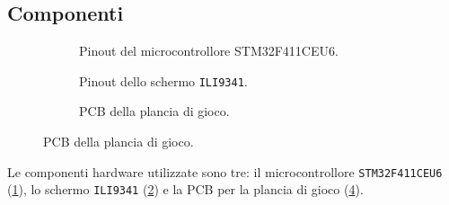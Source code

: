 \documentclass[12pt]{article}
\begin{document}
\subsection{Componenti}
\begin{figure}[h]
	\begin{subfigure}[t]{0.32\textwidth}
		\begin{center}
			\begin{tikzpicture}[x=0.015cm, y=0.015cm, scale=0.5, transform shape]
				
			\end{tikzpicture}
		\end{center}
		\caption{Pinout del microcontrollore STM32F411CEU6.}
		\label{fig:pinout_stm32}
	\end{subfigure}
	\hfill
	\begin{subfigure}[t]{0.32\textwidth}
		\begin{center}
			\begin{tikzpicture}[x=0.015cm, y=0.015cm, scale=0.5, transform shape]
				
			\end{tikzpicture}
		\end{center}
		\caption{Pinout dello schermo \texttt{ILI9341}.}
		\label{fig:pinout_ili}
	\end{subfigure}
	\hfill
	\begin{subfigure}[t]{0.32\textwidth}
		\begin{center}
			\begin{tikzpicture}[x=0.015cm, y=0.015cm, scale=1, transform shape]
				
			\end{tikzpicture}
		\end{center}
		\caption{PCB della plancia di gioco.}
		\label{fig:pinout_pcb}
	\end{subfigure}
\end{figure}
Le componenti hardware utilizzate sono tre: il microcontrollore
\texttt{STM32F411CEU6} (\cref{fig:pinout_stm32}), lo schermo \texttt{ILI9341}
(\cref{fig:pinout_ili}) e la PCB per la plancia di gioco (\cref{fig:pinout_pcb}).
\end{document}
